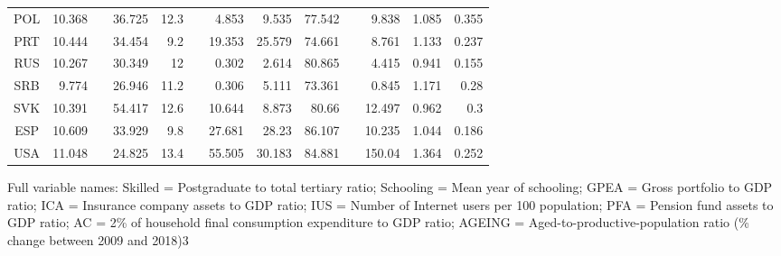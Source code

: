 {\begin{tabular}{cd{3} c d{3}d{1} c d{3}d{3}d{3} c d{3}d{3}d{3}}
    POL   & 10.368 &       & 36.725 & 12.3  &       & 4.853 & 9.535 & 77.542 &       & 9.838 & 1.085 & 0.355 \\
    PRT   & 10.444 &       & 34.454 & 9.2   &       & 19.353 & 25.579 & 74.661 &       & 8.761 & 1.133 & 0.237 \\
    RUS   & 10.267 &       & 30.349 & 12    &       & 0.302 & 2.614 & 80.865 &       & 4.415 & 0.941 & 0.155 \\
    SRB   & 9.774 &       & 26.946 & 11.2  &       & 0.306 & 5.111 & 73.361 &       & 0.845 & 1.171 & 0.28 \\
    SVK   & 10.391 &       & 54.417 & 12.6  &       & 10.644 & 8.873 & 80.66 &       & 12.497 & 0.962 & 0.3 \\
    ESP   & 10.609 &       & 33.929 & 9.8   &       & 27.681 & 28.23 & 86.107 &       & 10.235 & 1.044 & 0.186 \\
    USA   & 11.048 &       & 24.825 & 13.4  &       & 55.505 & 30.183 & 84.881 &       & 150.04 & 1.364 & 0.252 \\
    \bottomrule
    \end{tabular}
}{Full variable names: Skilled = Postgraduate to total tertiary ratio; Schooling = Mean year of schooling; GPEA = Gross portfolio to GDP ratio; ICA = Insurance company assets to GDP ratio; IUS = Number of Internet users per 100 population; PFA = Pension fund assets to GDP ratio; AC = 2\% of household final consumption expenditure to GDP ratio; AGEING = Aged-to-productive-population ratio (\% change between 2009 and 2018)}{3}
